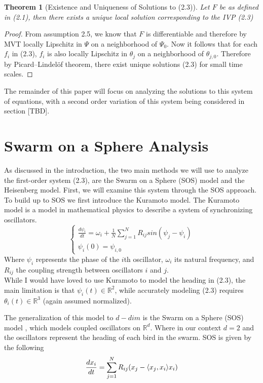 \documentclass[11pt,a4paper]{article}
\numberwithin{equation}{section}
\newcommand{\R}{\mathbb{R}}
\newtheorem{theorem}{Theorem}[section]
\theoremstyle{definition}
\theoremstyle{assumption}
\begin{document}
\begin{theorem}[Existence and Uniqueness of Solutions to (2.3)]\label{thm:existence_uniqueness}
Let $F$ be as defined in (2.1), then there exists a unique local solution corresponding to the IVP (2.3) 
\end{theorem}

\begin{proof}
From assumption 2.5, we know that $F$ is differentiable and therefore by MVT locally Lipschitz in $\Psi$ on a neighborhood of $\Psi_0$.
Now it follows that for each $f_i$ in (2.3), $f_i$ is also locally Lipschitz in $\theta_j$ on a neighborhood of $\theta_{j,0}$. Therefore
by Picard–Lindelöf theorem, there exist unique solutions (2.3) for small time scales.
\end{proof}

The remainder of this paper will focus on analyzing the solutions to this system of equations, 
with a second order variation of this system being considered in section [TBD].

\section{Swarm on a Sphere Analysis}
As discussed in the introduction, the two main methods we will use to analyze the first-order system (2.3), are the 
Swarm on a Sphere (SOS) model and the Heisenberg model. First, we will examine this system through the SOS approach.
To build up to SOS we first introduce the Kuramoto model. The Kuramoto model is a model in mathematical physics to describe
 a system of synchronizing oscillators. 
\begin{equation}
    \begin{cases}
            \frac{d\psi_i}{dt}=\omega_i + \frac1N \sum_{j=1}^N R_{ij} sin(\psi_j-\psi_i)\\
            \psi_i(0)=\psi_{i,0}
    \end{cases}
\end{equation}
Where $\psi_i$ represents the phase of the $i$th oscillator, $\omega_i$ its natural frequency, and $R_{ij}$ the coupling strength between oscillators $i$ and $j$.
\\
While I would have loved to use Kuramoto to model the heading in (2.3), the main 
limitation is that $\psi_i(t)\in \R^2$, while accurately modeling (2.3) requires $\theta_i(t)\in \R^3$ (again assumed normalized).

The generalization of this model to $d-dim$ is the Swarm on a Sphere (SOS) model \cite{SOS}, which models
coupled oscillators on $\mathbb{R}^d$. Where in our context $d=2$ and the oscillators represent the heading of each bird in the swarm.
SOS is given by the following 
\begin{equation}
        \frac{dx_i}{dt}=\sum_{j=1}^N R_{ij}(x_j-\langle x_j,x_i\rangle x_i)\\ 
\end{equation}
\end{document}
